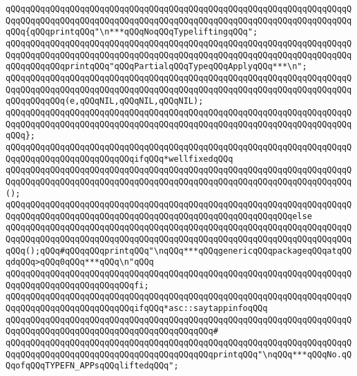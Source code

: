 \verb|qQQqqQQqqQQqqQQqqQQqqQQqqQQqqQQqqQQqqQQqqQQqqQQqqQQqqQQqqQQqqQQqqQQqqQQqqQQqqQQqqQQqqQQqqQQqqQQqqQQqqQQqqQQqqQQqqQQqqQQqqQQqqQQqqQQqqQQqqQQqqQQq{qQQqprintqQQq"\n***qQQqNoqQQqTypeliftingqQQq";|\newline
\verb|qQQqqQQqqQQqqQQqqQQqqQQqqQQqqQQqqQQqqQQqqQQqqQQqqQQqqQQqqQQqqQQqqQQqqQQqqQQqqQQqqQQqqQQqqQQqqQQqqQQqqQQqqQQqqQQqqQQqqQQqqQQqqQQqqQQqqQQqqQQqqQQqqQQqqQQqprintqQQq"qQQqPartialqQQqTypeqQQqApplyqQQq***\n";|\newline
\verb|qQQqqQQqqQQqqQQqqQQqqQQqqQQqqQQqqQQqqQQqqQQqqQQqqQQqqQQqqQQqqQQqqQQqqQQqqQQqqQQqqQQqqQQqqQQqqQQqqQQqqQQqqQQqqQQqqQQqqQQqqQQqqQQqqQQqqQQqqQQqqQQqqQQqqQQq(e,qQQqNIL,qQQqNIL,qQQqNIL);|\newline
\verb|qQQqqQQqqQQqqQQqqQQqqQQqqQQqqQQqqQQqqQQqqQQqqQQqqQQqqQQqqQQqqQQqqQQqqQQqqQQqqQQqqQQqqQQqqQQqqQQqqQQqqQQqqQQqqQQqqQQqqQQqqQQqqQQqqQQqqQQqqQQqqQQq};|\newline
\newline
\verb|qQQqqQQqqQQqqQQqqQQqqQQqqQQqqQQqqQQqqQQqqQQqqQQqqQQqqQQqqQQqqQQqqQQqqQQqqQQqqQQqqQQqqQQqqQQqqQQqifqQQq*wellfixedqQQq|\newline
\verb|qQQqqQQqqQQqqQQqqQQqqQQqqQQqqQQqqQQqqQQqqQQqqQQqqQQqqQQqqQQqqQQqqQQqqQQqqQQqqQQqqQQqqQQqqQQqqQQqqQQqqQQqqQQqqQQqqQQqqQQqqQQqqQQqqQQqqQQqqQQq();|\newline
\verb|qQQqqQQqqQQqqQQqqQQqqQQqqQQqqQQqqQQqqQQqqQQqqQQqqQQqqQQqqQQqqQQqqQQqqQQqqQQqqQQqqQQqqQQqqQQqqQQqqQQqqQQqqQQqqQQqqQQqqQQqqQQqqQQqelse|\newline
\verb|qQQqqQQqqQQqqQQqqQQqqQQqqQQqqQQqqQQqqQQqqQQqqQQqqQQqqQQqqQQqqQQqqQQqqQQqqQQqqQQqqQQqqQQqqQQqqQQqqQQqqQQqqQQqqQQqqQQqqQQqqQQqqQQqqQQqqQQqqQQqqQQq();qQQq#qQQqqQQqprintqQQq"\nqQQq***qQQqgenericqQQqpackageqQQqatqQQqdqQQq>qQQq0qQQq***qQQq\n"qQQq|\newline
\verb|qQQqqQQqqQQqqQQqqQQqqQQqqQQqqQQqqQQqqQQqqQQqqQQqqQQqqQQqqQQqqQQqqQQqqQQqqQQqqQQqqQQqqQQqqQQqqQQqfi;|\newline
\newline
\verb|qQQqqQQqqQQqqQQqqQQqqQQqqQQqqQQqqQQqqQQqqQQqqQQqqQQqqQQqqQQqqQQqqQQqqQQqqQQqqQQqqQQqqQQqqQQqqQQqifqQQq*asc::saytappinfoqQQq|\newline
\verb|qQQqqQQqqQQqqQQqqQQqqQQqqQQqqQQqqQQqqQQqqQQqqQQqqQQqqQQqqQQqqQQqqQQqqQQqqQQqqQQqqQQqqQQqqQQqqQQqqQQqqQQqqQQqqQQq#|\newline
\verb|qQQqqQQqqQQqqQQqqQQqqQQqqQQqqQQqqQQqqQQqqQQqqQQqqQQqqQQqqQQqqQQqqQQqqQQqqQQqqQQqqQQqqQQqqQQqqQQqqQQqqQQqqQQqqQQqprintqQQq"\nqQQq***qQQqNo.qQQqofqQQqTYPEFN_APPsqQQqliftedqQQq";|\newline
